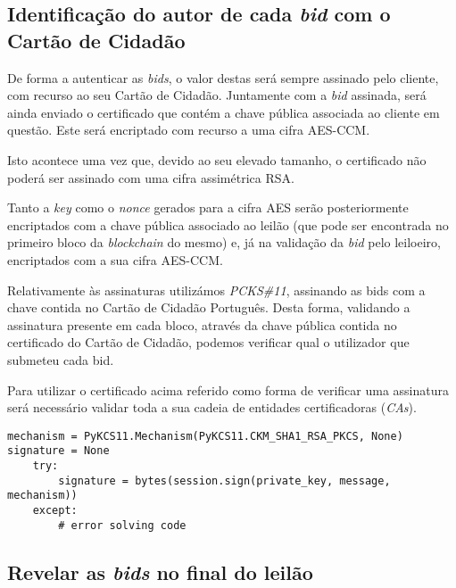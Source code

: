 \documentclass[12pt]{article}
\begin{document}
\subsection{Identificação do autor de cada \textit{bid} com o Cartão de Cidadão}

\par De forma a autenticar as \textit{bids}, o valor destas será sempre assinado pelo cliente, com recurso ao seu Cartão de Cidadão. Juntamente com a  \textit{bid} assinada, será ainda enviado o certificado que contém a chave pública associada ao cliente em questão. Este será encriptado com recurso a uma cifra AES-CCM.

\par Isto acontece uma vez que, devido ao seu elevado tamanho, o certificado não poderá ser assinado com uma cifra assimétrica RSA.

\par  Tanto a \textit{key} como o \textit{nonce} gerados para a cifra AES serão posteriormente encriptados com a chave pública associado ao leilão (que pode ser encontrada no primeiro bloco da \textit{blockchain} do mesmo) e, já na validação da \textit{bid} pelo leiloeiro, encriptados com a sua cifra AES-CCM.

\par Relativamente às assinaturas utilizámos \textit{PCKS\#11}, assinando as bids com a chave contida no Cartão de Cidadão Português. Desta forma, validando a assinatura presente em cada bloco, através da chave pública contida no certificado do Cartão de Cidadão, podemos verificar qual o utilizador que submeteu cada bid.

\par Para utilizar o certificado acima referido como forma de verificar uma assinatura será necessário validar toda a sua cadeia de entidades certificadoras (\textit{CAs}).

\vspace{8mm} %



\begin{lstlisting}[caption={Assinatura com Recurso ao Cartão de Cidadão},captionpos=b]
mechanism = PyKCS11.Mechanism(PyKCS11.CKM_SHA1_RSA_PKCS, None)
signature = None
    try:
        signature = bytes(session.sign(private_key, message, mechanism))
    except:
        # error solving code
\end{lstlisting}


\subsection{Revelar as \textit{bids} no final do leilão}
\end{document}
